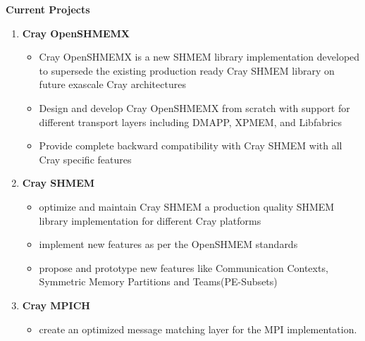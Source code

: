 \textbf{Current Projects}
\begin{enumerate}
\setcounter{enumi}{0}
\item \textbf{Cray OpenSHMEMX}
    \begin{itemize}
        \item Cray OpenSHMEMX is a new SHMEM library implementation developed to
        supersede the existing production ready Cray SHMEM library on future
        exascale Cray architectures
        \item Design and develop Cray OpenSHMEMX from scratch with support for
        different transport layers including DMAPP, XPMEM, and Libfabrics
        \item Provide complete backward compatibility with Cray SHMEM with all
        Cray specific features
    \end{itemize}

\item \textbf{Cray SHMEM}
    \begin{itemize}
        \item optimize and maintain Cray SHMEM a production quality SHMEM
        library implementation for different Cray platforms
        \item implement new features as per the OpenSHMEM standards
        \item propose and prototype new features like Communication
        Contexts, Symmetric Memory Partitions and Teams(PE-Subsets)
    \end{itemize}

\item \textbf{Cray MPICH}
    \begin{itemize}
        \item create an optimized message matching layer for the MPI
        implementation.
    \end{itemize}
\end{enumerate}

